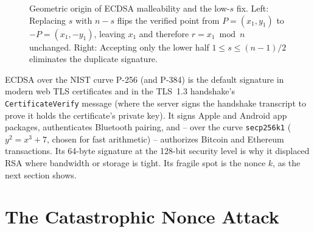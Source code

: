 \begin{figure}[htbp]
\caption{Geometric origin of ECDSA malleability and the low-$s$ fix. Left: Replacing $s$ with $n - s$ flips the verified point from $P = (x_1, y_1)$ to $-P = (x_1, -y_1)$, leaving $x_1$ and therefore $r = x_1 \bmod n$ unchanged. Right: Accepting only the lower half $1 \le s \le (n-1)/2$ eliminates the duplicate signature.}
\label{fig:ch22-ecdsa-malleability}
\end{figure}

\begin{applicationbox}
ECDSA over the NIST curve P-256 (and P-384) is the default signature in modern web TLS certificates and in the TLS~1.3 handshake's \texttt{CertificateVerify} message (where the server signs the handshake transcript to prove it holds the certificate's private key). It signs Apple and Android app packages, authenticates Bluetooth pairing, and -- over the curve \texttt{secp256k1} ($y^2 = x^3 + 7$, chosen for fast arithmetic) -- authorizes Bitcoin and Ethereum transactions. Its 64-byte signature at the 128-bit security level is why it displaced RSA where bandwidth or storage is tight. Its fragile spot is the nonce $k$, as the next section shows.
\end{applicationbox}

\section{The Catastrophic Nonce Attack}
\label{ch22:nonce-attack}

